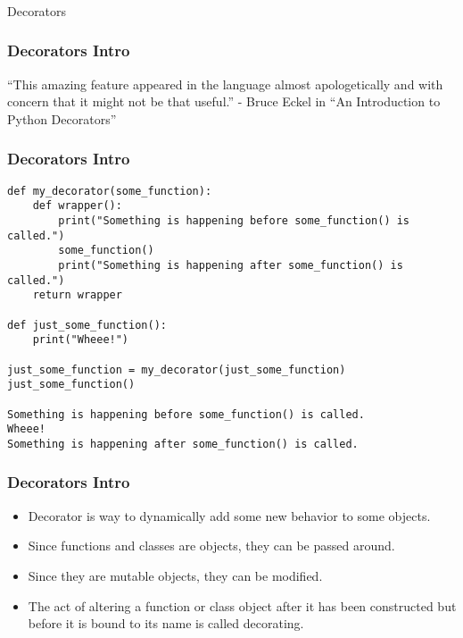 \begin{frame}[fragile]\frametitle{}
\begin{center}
{\Large Decorators}
\end{center}
\end{frame}

\begin{frame}[fragile]\frametitle{Decorators Intro}
``This amazing feature appeared in the language almost apologetically and with concern that it might not be that useful.''
-  Bruce Eckel in ``An Introduction to Python Decorators''
\end{frame}

\begin{frame}[fragile]\frametitle{Decorators Intro}
        \begin{lstlisting}
def my_decorator(some_function):
    def wrapper():
        print("Something is happening before some_function() is called.")
        some_function()
        print("Something is happening after some_function() is called.")
    return wrapper

def just_some_function():
    print("Wheee!")

just_some_function = my_decorator(just_some_function)
just_some_function()

Something is happening before some_function() is called.
Wheee!
Something is happening after some_function() is called.
\end{lstlisting}
\end{frame}



\begin{frame}[fragile]\frametitle{Decorators Intro}
    \begin{itemize}
    	\item Decorator is way to dynamically add some new behavior to some objects. 
    \item  Since functions and classes are objects, they can be passed around. 
    \item Since they are mutable objects, they can be modified. 
    \item The act of altering a function or class object after it has been constructed but before it is bound to its name is called decorating.
    \end{itemize}
\end{frame}

